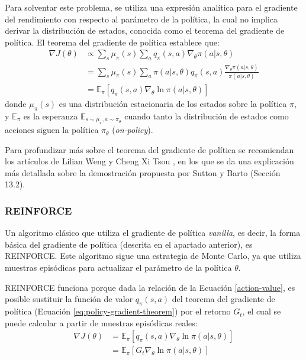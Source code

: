 Para solventar este problema, se utiliza una expresión analítica para el gradiente del rendimiento con respecto al parámetro de la política, la cual no implica derivar la distribución de estados, conocida como el teorema del gradiente de política. El teorema del gradiente de política establece que:
\begin{equation}
    \begin{split}
        \nabla J(\theta) &\propto\sum_s \mu_\pi(s) \sum_a q_\pi (s,a)\nabla_\theta \pi(a|s,\theta) \\
        &= \sum_s \mu_\pi(s) \sum_a \pi(a|s,\theta)q_\pi(s,a)\frac{\nabla_\theta \pi(a|s,\theta)}{\pi(a|s,\theta)} \\
        &= \mathbb{E}_\pi\left[q_\pi(s,a)\nabla_\theta \ln \pi(a|s,\theta)\right]
    \end{split}
    \label{eq:policy-gradient-theorem}
\end{equation}
donde $\mu_\pi(s)$ es una distribución estacionaria de los estados sobre la política $\pi$, y $\mathbb{E}_\pi$ es la esperanza $\mathbb{E}_{s\sim\mu_\pi,a\sim\pi_\theta}$ cuando tanto la distribución de estados como acciones siguen la política $\pi_\theta$ (\emph{on-policy}).

Para profundizar más sobre el teorema del gradiente de política se recomiendan los artículos de Lilian Weng \cite{lilian-weng} y Cheng Xi Tsou \cite{cheng-xi-tsou}, en los que se da una explicación más detallada sobre la demostración propuesta por Sutton y Barto \cite{Sutton1998} (Sección 13.2).

\subsubsection{REINFORCE}

Un algoritmo clásico que utiliza el gradiente de política \emph{vanilla}, es decir, la forma básica del gradiente de política (descrita en el apartado anterior), es REINFORCE. Este algoritmo sigue una estrategia de Monte Carlo, ya que utiliza muestras episódicas para actualizar el parámetro de la política $\theta$.

REINFORCE funciona porque dada la relación de la Ecuación \ref{action-value}, es posible sustituir la función de valor $q_\pi(s,a)$ del teorema del gradiente de política (Ecuación \ref{eq:policy-gradient-theorem}) por el retorno $G_t$, el cual se puede calcular a partir de muestras episódicas reales:
\begin{equation}
    \begin{split}
        \nabla J(\theta) &= \mathbb{E}_\pi\left[q_\pi(s,a)\nabla_\theta \ln \pi(a|s,\theta)\right] \\
        &= \mathbb{E}_\pi\left[G_t\nabla_\theta \ln \pi(a|s,\theta)\right]
    \end{split}
    \label{eq:reinforce}
\end{equation}


